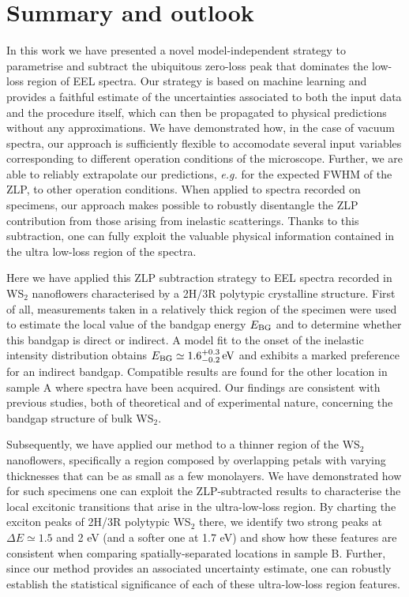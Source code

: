 \section{Summary and outlook}
\label{sec:summary}

In this work we have presented a novel model-independent strategy to parametrise and subtract
the ubiquitous zero-loss peak that dominates  the low-loss region
of EEL spectra.
%
Our strategy is based on machine learning and provides a faithful estimate of the
uncertainties associated to both the input data and the procedure itself,
which can  then be propagated to physical predictions  without any  approximations.
%
We have demonstrated how, in the case of vacuum spectra, our approach
is sufficiently flexible to accomodate several input variables corresponding
to different operation conditions of the microscope.
%
Further, we are able  to reliably
extrapolate our predictions, {\it e.g.} for the  expected FWHM of the ZLP,
to other operation conditions.
%
When applied to spectra recorded on specimens, our approach
makes possible to robustly disentangle the ZLP contribution from
those arising from inelastic scatterings.
%
Thanks to this subtraction, one can fully exploit
the valuable physical information contained in the ultra low-loss region of
the spectra.

Here we have applied this ZLP subtraction
strategy to EEL spectra recorded in  WS$_2$ nanoflowers characterised by a
2H/3R polytypic crystalline structure.
%
First of all, measurements taken in a relatively
thick region of the specimen were used to estimate the local value of the bandgap energy $E_{\rm BG}$
and to determine whether this bandgap is direct or indirect.
%
A model fit to the onset of the inelastic intensity distribution obtains
$E_{\rm BG} \simeq 1.6^{+0.3}_{-0.2}\,{\rm eV}$ and exhibits a marked preference for an indirect bandgap.
%
Compatible results are found for the other location
in sample A where spectra have been acquired.
%
Our findings are consistent with previous studies, both of theoretical
and of experimental nature, concerning the bandgap structure of bulk WS$_2$.

Subsequently, we have applied our method to a  thinner region of the  WS$_2$ nanoflowers,
specifically a region composed by overlapping petals with varying
thicknesses that can be as small as a few monolayers.
%
We have demonstrated how for such specimens one can exploit the ZLP-subtracted results
to characterise the local excitonic transitions that arise in the ultra-low-loss region.
%
By charting the exciton peaks of 2H/3R polytypic WS$_2$ there,
we identify two strong peaks at $\Delta E\simeq 1.5$ and 2 eV
(and a softer one at 1.7 eV) and show how
these features are consistent when comparing
spatially-separated locations in sample B.
%
Further, since our method provides an associated uncertainty estimate,
one can robustly establish the
statistical significance of each of these
ultra-low-loss region features.

